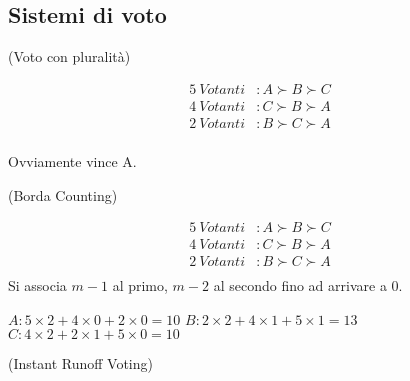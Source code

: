 \subsection{Sistemi di voto}

\begin{esempio}
    (Voto con pluralità)

    \begin{equation}
        \begin{aligned}
            5 \ Votanti &: A \succ B \succ C \\
            4 \ Votanti &: C \succ B \succ A \\
            2 \ Votanti &: B \succ C \succ A \\
        \end{aligned}
    \end{equation}

    Ovviamente vince A.
\end{esempio}

\begin{esempio}
    (Borda Counting)

    
    \begin{equation}
        \begin{aligned}
            5 \ Votanti &: A \succ B \succ C \\
            4 \ Votanti &: C \succ B \succ A \\
            2 \ Votanti &: B \succ C \succ A \\
        \end{aligned}
    \end{equation}
    Si associa $m-1$ al primo, $m-2$ al secondo fino ad arrivare a 0.

    $A: 5 \times 2 + 4 \times 0 + 2 \times 0 = 10$
    $B: 2 \times 2 + 4 \times 1 + 5 \times 1 = 13$
    $C: 4 \times 2 + 2 \times 1 + 5 \times 0 = 10$
\end{esempio}


\begin{esempio}
    (Instant Runoff Voting)
\end{esempio}

